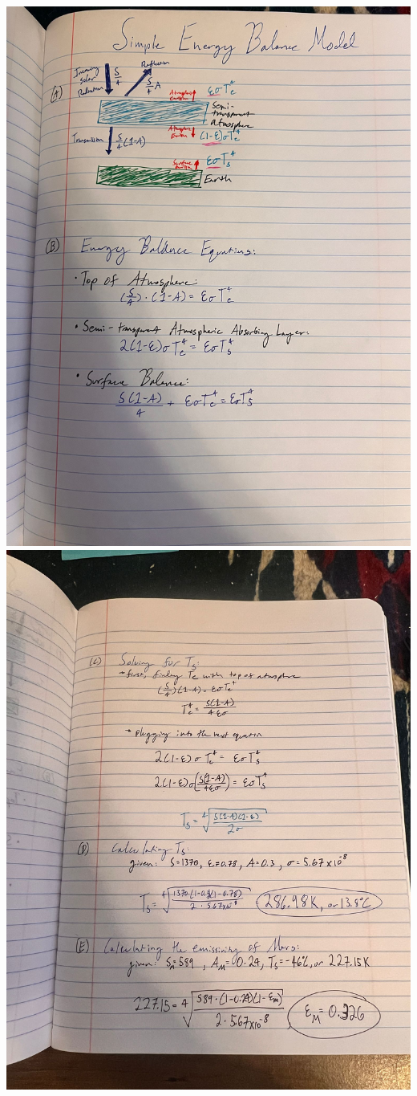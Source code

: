 \documentclass[
  letterpaper,
  DIV=11,
  numbers=noendperiod]{scrartcl}
\begin{document}
\includegraphics{Part_1_Images/parta_b.jpeg}
\includegraphics{Part_1_Images/partc_e.jpeg}
\end{document}
